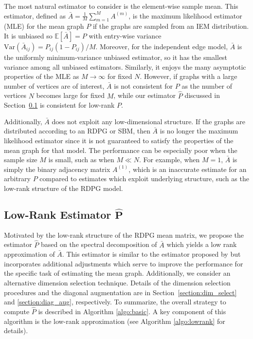 \documentclass[journal,twoside,web]{ieeecolor}
\newcommand{\Ex}{\mathbb{E}}
\begin{document}
The most natural estimator to consider is the element-wise sample mean.
This estimator, defined as $\bar{A}=\frac{1}{M}\sum_{m=1}^M A^{(m)}$, is the  maximum likelihood estimator (MLE) for the mean graph $P$ if the graphs are sampled from an IEM distribution.
It is unbiased so $\Ex[\bar{A}]=P$ with entry-wise variance $\mathrm{Var}(\bar{A}_{ij}) = P_{ij} (1-P_{ij})/M$. 
Moreover, for the independent edge model, $\bar{A}$ is the uniformly minimum-variance unbiased estimator, so it has the smallest variance among all unbiased estimators.
Similarly, it enjoys the many asymptotic properties of the MLE as $M\to \infty$ for fixed $N$.
However, if graphs with a large number of vertices are of interest, $\bar{A}$ is not consistent for $P$ as the number of vertices $N$ becomes large for fixed $M$, while our estimator $\hat{P}$ discussed in Section~\ref{sec:phat} is consistent for low-rank $P$.

Additionally, $\bar{A}$ does not exploit any low-dimensional structure.
If the graphs are distributed according to an RDPG or SBM, then $\bar{A}$ is no longer the maximum likelihood estimator since it is not guaranteed to satisfy the properties of the mean graph for that model.
The performance can be especially poor when the sample size $M$ is small, such as when $M\ll N$.
For example, when $M=1$, $\bar{A}$ is simply the binary adjacency matrix $A^{(1)}$, which is an inaccurate estimate for an arbitrary $P$ compared to estimates which exploit underlying structure, such as the low-rank structure of the RDPG model.

\subsection[Low-Rank Estimator]{Low-Rank Estimator $\bm{\hat{P}}$}
\label{sec:phat}

Motivated by the low-rank structure of the RDPG mean matrix, we propose the estimator $\hat{P}$ based on the spectral decomposition of $\bar{A}$ which yields a low rank approximation of $\bar{A}$.
% 
This estimator is similar to the estimator proposed by \cite{chatterjee2015matrix} but incorporates additional adjustments which serve to improve the performance for the specific task of estimating the mean graph.
Additionally, we consider an alternative dimension selection technique.
Details of the dimension selection procedures and the diagonal augmentation are in Section~\ref{section:dim_select} and \ref{section:diag_aug}, respectively.
To summarize, the overall strategy to compute $\hat{P}$ is described in Algorithm \ref{algo:basic}.
A key component of this algorithm is the low-rank approximation (see Algorithm \ref{algo:lowrank} for details).
\end{document}
